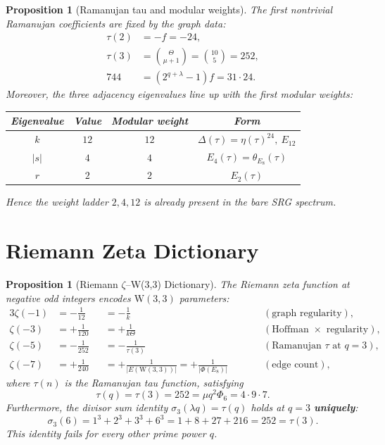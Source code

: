 \documentclass[12pt,a4paper]{article}
\newtheorem{proposition}[theorem]{Proposition}
\newcommand{\W}{\mathrm{W}(3,3)}
\begin{document}
\begin{proposition}[Ramanujan tau and modular weights]\label{prop:tau-modular}
The first nontrivial Ramanujan coefficients are fixed by the graph data:
\begin{align}
  \tau(2) &= -f = -24,\label{eq:tau2}\\
  \tau(3) &= \binom{\Theta}{\mu+1} = \binom{10}{5} = 252,\label{eq:tau3}\\
  744 &= (2^{q+\lambda}-1)f = 31\cdot 24.\label{eq:j744}
\end{align}
Moreover, the three adjacency eigenvalues line up with the first modular
weights:
\begin{center}
\renewcommand{\arraystretch}{1.15}
\begin{tabular}{cccc}
\toprule
Eigenvalue & Value & Modular weight & Form \\
\midrule
$k$ & $12$ & $12$ & $\Delta(\tau)=\eta(\tau)^{24},\ E_{12}$ \\
$|s|$ & $4$ & $4$ & $E_4(\tau)=\theta_{E_8}(\tau)$ \\
$r$ & $2$ & $2$ & $E_2(\tau)$ \\
\bottomrule
\end{tabular}
\end{center}
Hence the weight ladder $2,4,12$ is already present in the bare SRG spectrum.
\end{proposition}

\section{Riemann Zeta Dictionary}
\label{sec:zeta-dict}

\begin{proposition}[Riemann $\zeta$--W(3,3) Dictionary]\label{prop:zeta-dict}
The Riemann zeta function at negative odd integers encodes $\W$
parameters:
\begin{alignat*}{3}
  \zeta(-1) &= -\tfrac{1}{12} &&= -\tfrac{1}{k}
    &\qquad& (\text{graph regularity}), \\
  \zeta(-3) &= +\tfrac{1}{120} &&= +\tfrac{1}{k\Theta}
    && (\text{Hoffman $\times$ regularity}), \\
  \zeta(-5) &= -\tfrac{1}{252} &&= -\tfrac{1}{\tau(3)}
    && (\text{Ramanujan $\tau$ at } q{=}3), \\
  \zeta(-7) &= +\tfrac{1}{240} &&= +\tfrac{1}{|E(\W)|}
    = +\tfrac{1}{|\Phi(E_8)|}
    && (\text{edge count}),
\end{alignat*}
where $\tau(n)$ is the Ramanujan tau function, satisfying
\[
  \tau(q) = \tau(3) = 252 = \mu q^2 \Phi_6 = 4 \cdot 9 \cdot 7.
\]
Furthermore, the divisor sum identity
$\sigma_3(\lambda q) = \tau(q)$ holds at $q = 3$ \textbf{uniquely}:
\[
  \sigma_3(6) = 1^3 + 2^3 + 3^3 + 6^3 = 1 + 8 + 27 + 216 = 252 = \tau(3).
\]
This identity fails for every other prime power $q$.
\end{proposition}
\end{document}

